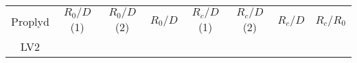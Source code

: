 \begin{table}
\begin{tabular}{|c|c|c|c|c|c|c|}
Proplyd & $R_0/D$ (1) & $R_0/D $ (2) & $R_0/D$ &$R_c/D$ (1) & $R_c/D $ (2)  & $R_c/D$  & $R_c/R_0$ \hline \\
LV2 & & & & & & & 
\end{tabular}
\end{table}
